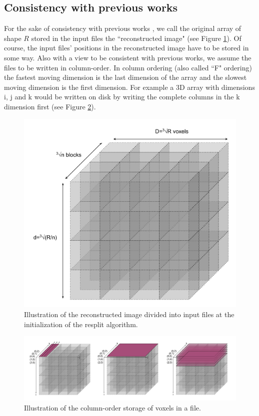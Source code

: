 \documentclass[conference]{IEEEtran}
\begin{document}
\subsection{Consistency with previous works}
For the sake of consistency with previous works \cite{seqalgorithms}, we call the original array of shape $R$ stored in the input files the ``reconstructed image" (see Figure \ref{fig:reconstructed_img_divided}).
Of course, the input files' positions in the reconstructed image have to be stored in some way.
Also with a view to be consistent with previous works, we assume the files to be written in column-order.
In column ordering (also called ``F" ordering) the fastest moving dimension is the last dimension of the array and the slowest moving dimension is the first dimension.
For example a 3D array with dimensions i, j and k would be written on disk by writing the complete columns in the k dimension first (see Figure \ref{fig:column_order}).

\begin{figure}[h!]
\centering
\includegraphics[scale=0.2]{./figures/reconstructed_img_divided.png}
\caption{Illustration of the reconstructed image divided into input files at the initialization of the resplit algorithm.
}
\label{fig:reconstructed_img_divided}
\end{figure}

\begin{figure}[h!]
\centering
\includegraphics[scale=0.2]{./figures/column_order.png}
\caption{Illustration of the column-order storage of voxels in a file.
}
\label{fig:column_order}
\end{figure}
\end{document}
